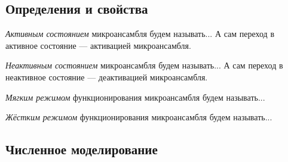 \subsection{Определения и свойства}

\begin{Definition}
    \textit{Активным состоянием} микроансамбля будем называть...
    А сам переход в активное состояние --- активацией микроансамбля.
\end{Definition}

\begin{Definition}
    \textit{Неактивным состоянием} микроансамбля будем называть...
    А сам переход в неактивное состояние --- деактивацией микроансамбля.
\end{Definition}

\begin{Definition}
    \textit{Мягким режимом} функционирования микроансамбля будем называть...
\end{Definition}

\begin{Definition}
    \textit{Жёстким режимом} функционирования микроансамбля будем называть...
\end{Definition}


%
%


\subsection{Численное моделирование}

